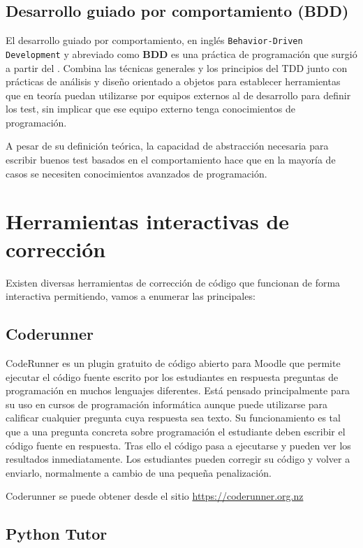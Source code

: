 \subsection {Desarrollo guiado por comportamiento (BDD)}

El desarrollo guiado por comportamiento, en inglés \texttt{Behavior-Driven Development} y abreviado como \textbf{BDD} es una práctica de programación que surgió a partir del . Combina las técnicas generales y los principios del TDD junto con prácticas de análisis y diseño orientado a objetos para establecer herramientas que en teoría puedan utilizarse por equipos externos al de desarrollo para definir los test, sin implicar que ese equipo externo tenga conocimientos de programación.

\bigskip
A pesar de su definición teórica, la capacidad de abstracción necesaria para escribir buenos test basados en el comportamiento hace que en la mayoría de casos se necesiten conocimientos avanzados de programación.

\section {Herramientas interactivas de corrección}

Existen diversas herramientas de corrección de código que funcionan de forma interactiva permitiendo, vamos a enumerar las principales:

\subsection {Coderunner}

CodeRunner es un plugin gratuito de código abierto para Moodle que permite ejecutar el código fuente escrito por los estudiantes en respuesta preguntas de programación en muchos lenguajes diferentes. Está pensado principalmente para su uso en cursos de programación informática aunque puede utilizarse para calificar cualquier pregunta cuya respuesta sea texto. Su funcionamiento es tal que a una pregunta concreta sobre programación el estudiante deben escribir el código fuente en respuesta. Tras ello el código pasa a ejecutarse y pueden ver los resultados inmediatamente. Los estudiantes pueden corregir su código y volver a enviarlo, normalmente a cambio de una pequeña penalización.

\bigskip
Coderunner se puede obtener desde el sitio \url{https://coderunner.org.nz}

\subsection {Python Tutor}

